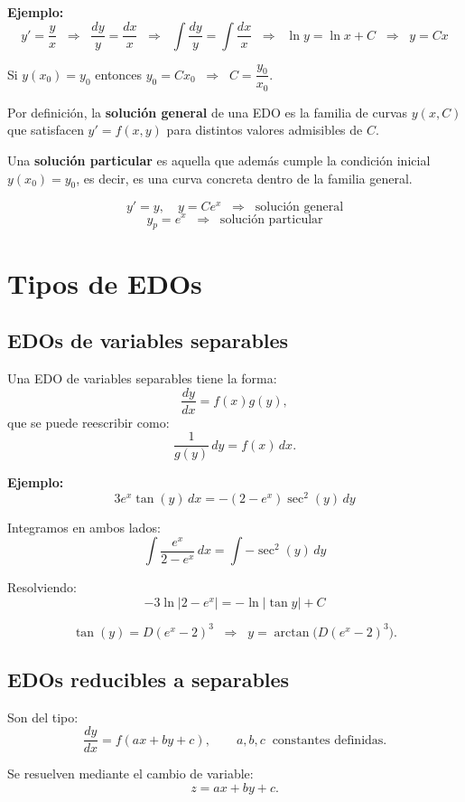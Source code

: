 \documentclass[a4paper,12pt]{article}
\begin{document}
\textbf{Ejemplo:}
\[
y' = \frac{y}{x} \;\;\Rightarrow\;\; \frac{dy}{y} = \frac{dx}{x}
\;\;\Rightarrow\;\; \int \frac{dy}{y} = \int \frac{dx}{x}
\;\;\Rightarrow\;\; \ln y = \ln x + C \;\;\Rightarrow\;\; y = Cx
\]

Si $y(x_0)=y_0$ entonces $y_0 = Cx_0 \;\;\Rightarrow\;\; C = \dfrac{y_0}{x_0}$.

\medskip

Por definición, la \textbf{solución general} de una EDO es la familia de curvas $y(x,C)$ que satisfacen $y'=f(x,y)$ para distintos valores admisibles de $C$.  

Una \textbf{solución particular} es aquella que además cumple la condición inicial $y(x_0)=y_0$,  
es decir, es una curva concreta dentro de la familia general.

\[
y' = y, \quad y = C e^x \;\; \Rightarrow \;\; \text{solución general}
\]
\[
y_p = e^x \;\; \Rightarrow \;\; \text{solución particular}
\]

\section{Tipos de EDOs}

\subsection{EDOs de variables separables}

Una EDO de variables separables tiene la forma:
\[
\frac{dy}{dx} = f(x)g(y),
\]
que se puede reescribir como:
\[
\frac{1}{g(y)}\,dy = f(x)\,dx.
\]

\textbf{Ejemplo:}
\[
3 e^x \tan(y)\, dx = -(2 - e^x)\sec^2(y)\, dy
\]

Integramos en ambos lados:
\[
\int \frac{e^x}{2-e^x}\,dx = \int -\sec^2(y)\,dy
\]

Resolviendo:
\[
-3 \ln|2-e^x| = -\ln|\tan y| + C
\]

\[
\tan(y) = D (e^x-2)^3 \;\;\Rightarrow\;\; y = \arctan\!\big(D(e^x-2)^3\big).
\]

\subsection{EDOs reducibles a separables}

Son del tipo:
\[
\frac{dy}{dx} = f(ax+by+c),
\qquad a,b,c \;\; \text{constantes definidas}.
\]

Se resuelven mediante el cambio de variable:
\[
z = ax + by + c.
\]
\end{document}

